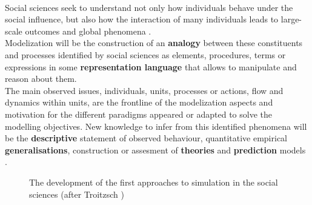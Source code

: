 \documentclass[11pt,oneside,a4paper,openright]{report}
\begin{document}
\\ 

Social sciences seek to understand not only how individuals behave under the social influence, but also how the interaction of 
many individuals leads to large-scale outcomes and global phenomena \cite[p.9]{GordonBurt2010}.\\ 
Modelization will be the construction of an \textbf{analogy} between these constituents and processes identified by social sciences as elements, procedures, terms or expressions in some \textbf{representation language} that allows to manipulate and reason about them.\\  
The main observed issues, individuals, units, processes or actions, flow and dynamics within units, are the frontline of the 
modelization aspects and motivation for the different paradigms appeared or adapted to solve the modelling objectives. New 
knowledge to infer from this identified phenomena will be the \textbf{descriptive} statement of observed behaviour, quantitative 
empirical \textbf{generalisations}, construction or assesment of \textbf{theories} and \textbf{prediction} models \cite[p.9-53]{Coleman1964}.


\begin{figure}[h]
\centering
\setlength\fboxsep{0pt}
\setlength\fboxrule{0.5pt}
\caption{The development of the first approaches to simulation in the social sciences (after Troitzsch )\cite{GilbertTroitzsch}}
\label{fig:SimAppGilbTro}
\end{figure}
\end{document}

